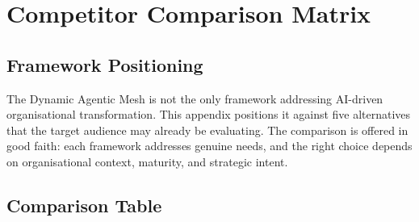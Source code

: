 \chapter{Competitor Comparison Matrix}
\label{ch:competitor-matrix}

\section{Framework Positioning}

The Dynamic Agentic Mesh is not the only framework addressing AI-driven organisational transformation. This appendix positions it against five alternatives that the target audience may already be evaluating. The comparison is offered in good faith: each framework addresses genuine needs, and the right choice depends on organisational context, maturity, and strategic intent.

\section{Comparison Table}


